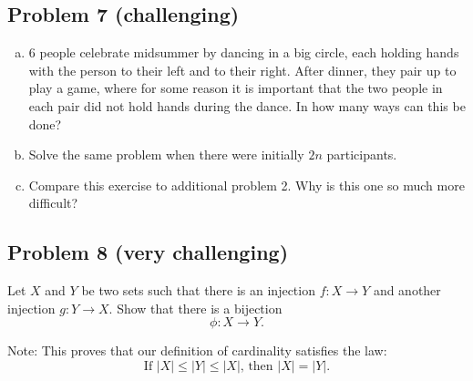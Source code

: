 \documentclass{amsart}
\theoremstyle{definition} \newtheorem*{definition}{Definition}
\theoremstyle{remark} \newtheorem*{ex}{Example}
\begin{document}
\subsection*{Problem 7 (challenging)}
\begin{enumerate}[a)]
\item $6$ people celebrate midsummer by dancing in a big circle, each holding hands with the person to their left and to their right. After dinner, they pair up to play a game, where for some reason it is important that the two people in each pair did not hold hands during the dance. In how many ways can this be done?
\item Solve the same problem when there were initially $2n$ participants.
\item Compare this exercise to additional problem 2. Why is this one so much more difficult?
\end{enumerate}

\subsection*{Problem 8 (very challenging)}
Let $X$ and $Y$ be two sets such that there is an injection $f:X\to Y$ and another injection $g:Y\to X$. Show that there is a bijection $$\phi: X\to Y.$$

Note: This proves that our definition of cardinality satisfies the law: $$ \mbox{If }|X|\leq |Y|\leq |X|\mbox{, then }|X|=|Y|.$$
\end{document}
